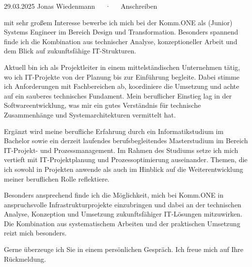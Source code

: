 \documentclass[11pt, a4paper]{awesome-cv}
\begin{document}
\makecvheader[R]

\makecvfooter
  {29.03.2025}
  {Jonas Wiedenmann~~~·~~~Anschreiben}
  {}

\makelettertitle

\begin{cvletter}

  mit sehr großem Interesse bewerbe ich mich bei der Komm.ONE als (Junior) Systems Engineer im Bereich Design und Transformation. Besonders spannend finde ich die Kombination aus technischer Analyse, konzeptioneller Arbeit und dem Blick auf zukunftsfähige IT-Strukturen.

  Aktuell bin ich als Projektleiter in einem mittelständischen Unternehmen tätig, wo ich IT-Projekte von der Planung bis zur Einführung begleite. Dabei stimme ich Anforderungen mit Fachbereichen ab, koordiniere die Umsetzung und achte auf ein sauberes technisches Fundament. Mein beruflicher Einstieg lag in der Softwareentwicklung, was mir ein gutes Verständnis für technische Zusammenhänge und Systemarchitekturen vermittelt hat.
  
  Ergänzt wird meine berufliche Erfahrung durch ein Informatikstudium im Bachelor sowie ein derzeit laufendes berufsbegleitendes Masterstudium im Bereich IT-Projekt- und Prozessmanagement. Im Rahmen des Studiums setze ich mich vertieft mit IT-Projektplanung und Prozessoptimierung auseinander. Themen, die ich sowohl in Projekten anwende als auch im Hinblick auf die Weiterentwicklung meiner beruflichen Rolle reflektiere. 
  
  Besonders ansprechend finde ich die Möglichkeit, mich bei Komm.ONE in anspruchsvolle Infrastrukturprojekte einzubringen und dabei an der technischen Analyse, Konzeption und Umsetzung zukunftsfähiger IT-Lösungen mitzuwirken. Die Kombination aus systematischem Arbeiten und der praktischen Umsetzung reizt mich besonders.
  
  Gerne überzeuge ich Sie in einem persönlichen Gespräch. Ich freue mich auf Ihre Rückmeldung.

\end{cvletter}


\makeletterclosing
\end{document}
